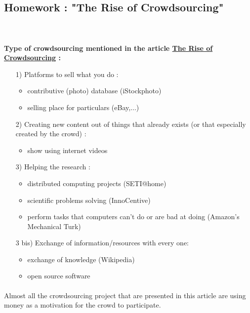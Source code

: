 \documentclass[14pt]
{article}
\begin{document}
\pagestyle{fancy}

\bigskip
\begin{center}
	\section*{\textbf{{\LARGE Homework : "The Rise of Crowdsourcing"}}}
\end{center}
\bigskip\bigskip\bigskip

\paragraph*{\\}\textbf{Type of crowdsourcing mentioned in the article \href{https://www.wired.com/2006/06/crowds/}{The Rise of Crowdsourcing} :}\\
\begin{itemize}
\item[1)] Platforms to sell what you do :\\
\begin{itemize}
\item contributive (photo) database (iStockphoto) \\
\item selling place for particulars (eBay,...) \\
\end{itemize}

\item[2)] Creating new content out of things that already exists (or that especially created by the crowd) : \\
\begin{itemize}
\item show using internet videos\\
\end{itemize}

\item[3)] Helping the research : \\
\begin{itemize}
\item distributed computing projects (SETI@home) \\
\item scientific problems solving (InnoCentive) \\ 
\item perform tasks that computers can't do or are bad at doing (Amazon's Mechanical Turk)\\
\end{itemize}

\item[3 bis)] Exchange of information/resources with every one:\\
\begin{itemize}
\item exchange of knowledge (Wikipedia)\\
\item open source software \\
\end{itemize}
\end{itemize}

\bigskip
\paragraph*{}Almost all the crowdsourcing project that are presented in this article are using money as a motivation for the crowd to participate.
\end{document}
